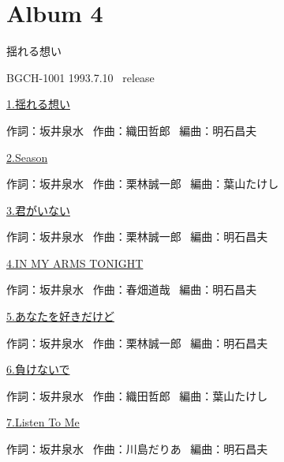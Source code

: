 
\chapter{Album 4}
\thispagestyle{empty} %
\vspace{-16mm}
\LARGE {揺れる想い}

\normalsize{BGCH-1001 1993.7.10 \ release}
\\

\vspace{-5mm}


\small{\hyperlink{4_0}{1.揺れる想い}}

\tiny{作詞：坂井泉水 \ 作曲：織田哲郎 \ 編曲：明石昌夫}

\small{\hyperlink{4_1}{2.Season}}

\tiny{作詞：坂井泉水 \ 作曲：栗林誠一郎 \ 編曲：葉山たけし}

\small{\hyperlink{4_2}{3.君がいない}}

\tiny{作詞：坂井泉水 \ 作曲：栗林誠一郎 \ 編曲：明石昌夫}

\small{\hyperlink{4_3}{4.IN MY ARMS TONIGHT}}

\tiny{作詞：坂井泉水 \ 作曲：春畑道哉 \ 編曲：明石昌夫}

\small{\hyperlink{4_4}{5.あなたを好きだけど}}

\tiny{作詞：坂井泉水 \ 作曲：栗林誠一郎 \ 編曲：明石昌夫}

\small{\hyperlink{4_5}{6.負けないで}}

\tiny{作詞：坂井泉水 \ 作曲：織田哲郎 \ 編曲：葉山たけし}

\small{\hyperlink{4_6}{7.Listen To Me}}

\tiny{作詞：坂井泉水 \ 作曲：川島だりあ \ 編曲：明石昌夫}

